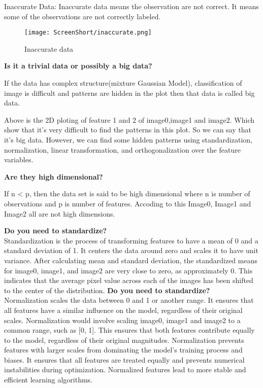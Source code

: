 \documentclass[conference,12pt]{IEEEtran}
\begin{document}
Inaccurate Data: Inaccurate data means the observation are not correct. It means some of the observations are not correctly labeled.
\begin{figure}[h]
    \centering
    \texttt{[image: ScreenShort/inaccurate.png]}
    \caption{Inaccurate data}
\end{figure}

\textbf{Is it a trivial data or possibly a big data?}

If the data has complex structure(mixture Gaussian Model), classification of image is difficult and patterns are hidden in the plot then that data is called big data.

Above is the 2D ploting of feature 1 and 2 of image0,image1 and image2. Which show that it's very difficult to find the patterns in this plot. So we can say that it's big data. However, we can find some hidden patterns using standardization, normalization, linear transformation, and orthogonalization over the feature variables.

\textbf{Are they high dimensional?}

If n < p, then the data set is said to be high dimensional where n is number of observations and p is number of features. Accoding to this Image0, Image1 and Image2 all are not high dimensions.

\textbf{Do you need to standardize?}\\
Standardization is the process of transforming features to have a mean of 0 and a standard deviation of 1. It centers the data around zero and scales it to have unit variance. After calculating mean and standard deviation, the standardized means for image0, image1, and image2 are very close to zero, as approximately 0.
This indicates that the average pixel value across each of the images has been shifted to the center of the distribution.
\textbf{Do you need to standardize?}\\
Normalization scales the data between 0 and 1 or another range. It ensures that all features have a similar influence on the model, regardless of their original scales.
Normalization would involve scaling image0, image1 and image2 to a common range, such as [0, 1]. This ensures that both features contribute equally to the model, regardless of their original magnitudes.
Normalization prevents features with larger scales from dominating the model's training process and biases. It ensures that all features are treated equally and prevents numerical instabilities during optimization. Normalized features lead to more stable and efficient learning algorithms.
\end{document}
